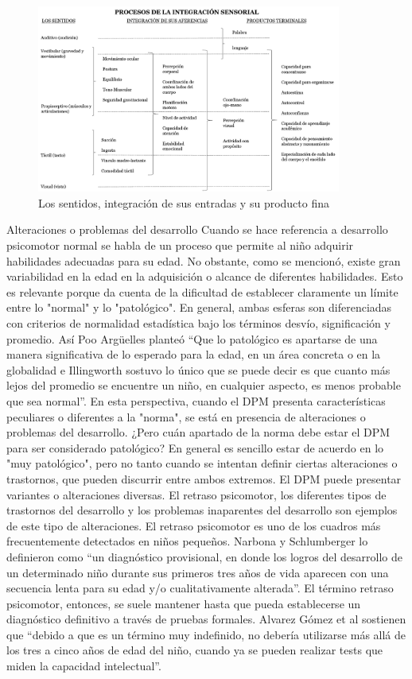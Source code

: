     \begin{figure}
    \centering
    \includegraphics[width=10cm]{Figura1.png}
    \caption{Los sentidos, integración de sus entradas y su producto fina}
    \end{figure}
    Alteraciones o problemas del desarrollo
    Cuando se hace referencia a desarrollo psicomotor normal se habla de un proceso que permite al niño adquirir habilidades adecuadas para su edad. No obstante, como se mencionó, existe gran variabilidad en la edad en la adquisición o alcance de diferentes habilidades. Esto es relevante porque da cuenta de la dificultad de establecer claramente un límite entre lo "normal" y lo "patológico". En general, ambas esferas son diferenciadas con criterios de normalidad estadística bajo los términos desvío, significación y promedio. Así Poo Argüelles planteó “Que lo patológico es apartarse de una manera significativa de lo esperado para la edad, en un área concreta o en la globalidad e Illingworth sostuvo lo único que se puede decir es que cuanto más lejos del promedio se encuentre un niño, en cualquier aspecto, es menos probable que sea normal”. En esta perspectiva, cuando el DPM presenta características peculiares o diferentes a la "norma", se está en presencia de alteraciones o problemas del desarrollo. ¿Pero cuán apartado de la norma debe estar el DPM para ser considerado patológico? En general es sencillo estar de acuerdo en lo "muy patológico", pero no tanto cuando se intentan definir ciertas alteraciones o trastornos, que pueden discurrir entre ambos extremos.
    El DPM puede presentar variantes o alteraciones diversas. El retraso psicomotor, los diferentes tipos de trastornos del desarrollo y los problemas inaparentes del desarrollo son ejemplos de este tipo de alteraciones. El retraso psicomotor es uno de los cuadros más frecuentemente detectados en niños pequeños. Narbona y Schlumberger lo definieron como “un diagnóstico provisional, en donde los logros del desarrollo de un determinado niño durante sus primeros tres años de vida aparecen con una secuencia lenta para su edad y/o cualitativamente alterada”. El término retraso psicomotor, entonces, se suele mantener hasta que pueda establecerse un diagnóstico definitivo a través de pruebas formales. Alvarez Gómez et al sostienen que “debido a que es un término muy indefinido, no debería utilizarse más allá de los tres a cinco años de edad del niño, cuando ya se pueden realizar tests que miden la capacidad intelectual”.
